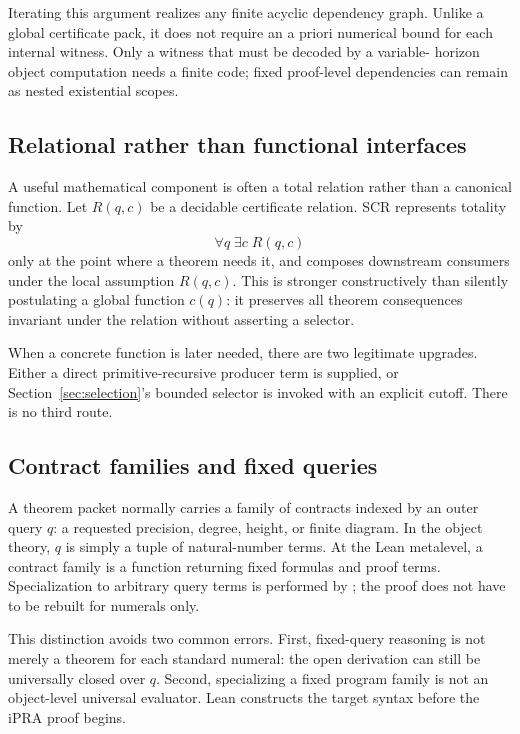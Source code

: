 Iterating this argument realizes any finite acyclic dependency graph.  Unlike
a global certificate pack, it does not require an a priori numerical bound for
each internal witness.  Only a witness that must be decoded by a variable-
horizon object computation needs a finite code; fixed proof-level dependencies
can remain as nested existential scopes.

\subsection{Relational rather than functional interfaces}

A useful mathematical component is often a total relation rather than a
canonical function.  Let \(R(q,c)\) be a decidable certificate relation.  SCR
represents totality by
\[
   \forall q\;\exists c\;R(q,c)
\]
only at the point where a theorem needs it, and composes downstream consumers
under the local assumption \(R(q,c)\).  This is stronger constructively than
silently postulating a global function \(c(q)\): it preserves all theorem
consequences invariant under the relation without asserting a selector.

When a concrete function is later needed, there are two legitimate upgrades.
Either a direct primitive-recursive producer term is supplied, or
Section~\ref{sec:selection}'s bounded selector is invoked with an explicit
cutoff.  There is no third route.

\subsection{Contract families and fixed queries}

A theorem packet normally carries a family of contracts indexed by an outer
query \(q\): a requested precision, degree, height, or finite diagram.  In the
object theory, \(q\) is simply a tuple of natural-number terms.  At the Lean
metalevel, a contract family is a function returning fixed formulas and proof
terms.  Specialization to arbitrary query terms is performed by
; the proof does not have to be rebuilt for numerals only.

This distinction avoids two common errors.  First, fixed-query reasoning is not
merely a theorem for each standard numeral: the open derivation can still be
universally closed over \(q\).  Second, specializing a fixed program family is
not an object-level universal evaluator.  Lean constructs the target syntax
before the iPRA proof begins.
